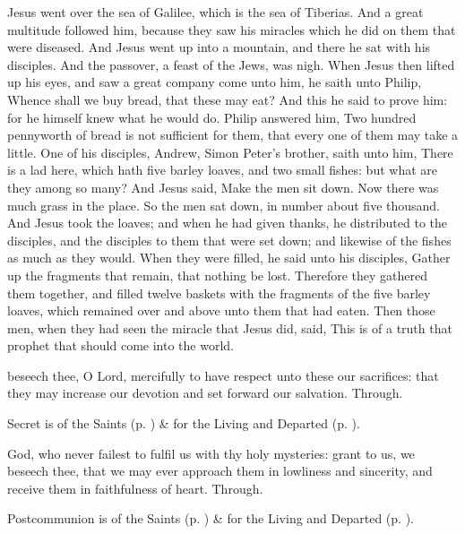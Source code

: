  Jesus went over the sea of Galilee, which is the sea of Tiberias. And a great multitude followed him, because they saw his miracles which he did on them that were diseased. And Jesus went up into a mountain, and there he sat with his disciples. And the passover, a feast of the Jews, was nigh. When Jesus then lifted up his eyes, and saw a great company come unto him, he saith unto Philip, Whence shall we buy bread, that these may eat? And this he said to prove him: for he himself knew what he would do. Philip answered him, Two hundred pennyworth of bread is not sufficient for them, that every one of them may take a little. One of his disciples, Andrew, Simon Peter's brother, saith unto him, There is a lad here, which hath five barley loaves, and two small fishes: but what are they among so many? And Jesus said, Make the men sit down. Now there was much grass in the place. So the men sat down, in number about five thousand. And Jesus took the loaves; and when he had given thanks, he distributed to the disciples, and the disciples to them that were set down; and likewise of the fishes as much as they would. When they were filled, he said unto his disciples, Gather up the fragments that remain, that nothing be lost. Therefore they gathered them together, and filled twelve baskets with the fragments of the five barley loaves, which remained over and above unto them that had eaten. Then those men, when they had seen the miracle that Jesus did, said, This is of a truth that prophet that should come into the world.

\secret
{} beseech thee, O Lord, mercifully to have respect unto these our sacrifices: that they may increase our devotion and set forward our salvation. Through.
\begin{rubric}
     Secret is of the Saints (p. \pageref{SPSaints}) \&  for the Living and Departed (p. \pageref{SPLivingDeparted}).
\end{rubric}
\postcommunion
{} God, who never failest to fulfil us with thy holy mysteries: grant to us, we beseech thee, that we may ever approach them in lowliness and sincerity, and receive them in faithfulness of heart. Through.
\begin{rubric}
     Postcommunion is of the Saints (p. \pageref{SPSaints}) \&  for the Living and Departed (p. \pageref{SPLivingDeparted}).
\end{rubric}

